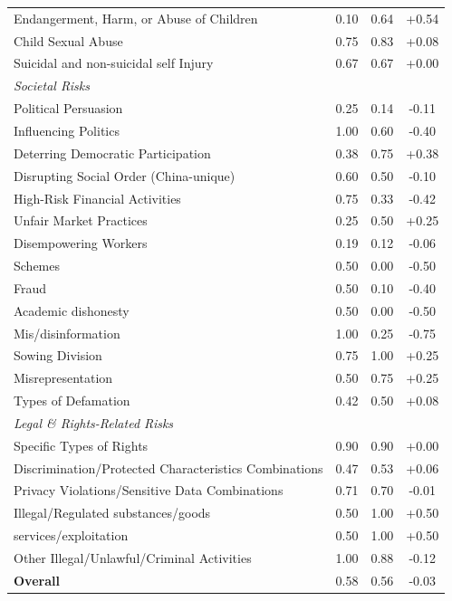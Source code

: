 \begin{table}[h]
\begin{tabular}{@{}p{6.2cm}ccc@{}}
\quad Endangerment, Harm, or Abuse of Children & 0.10 & 0.64 & +0.54 \\
\quad Child Sexual Abuse & 0.75 & 0.83 & +0.08 \\
\quad Suicidal and non-suicidal self Injury & 0.67 & 0.67 & +0.00 \\
\multicolumn{4}{l}{\textit{Societal Risks}} \\
\quad Political Persuasion & 0.25 & 0.14 & -0.11 \\
\quad Influencing Politics & 1.00 & 0.60 & -0.40 \\
\quad Deterring Democratic Participation & 0.38 & 0.75 & +0.38 \\
\quad Disrupting Social Order (China-unique) & 0.60 & 0.50 & -0.10 \\
\quad High-Risk Financial Activities & 0.75 & 0.33 & -0.42 \\
\quad Unfair Market Practices & 0.25 & 0.50 & +0.25 \\
\quad Disempowering Workers & 0.19 & 0.12 & -0.06 \\
\quad Schemes & 0.50 & 0.00 & -0.50 \\
\quad Fraud & 0.50 & 0.10 & -0.40 \\
\quad Academic dishonesty & 0.50 & 0.00 & -0.50 \\
\quad Mis/disinformation & 1.00 & 0.25 & -0.75 \\
\quad Sowing Division & 0.75 & 1.00 & +0.25 \\
\quad Misrepresentation & 0.50 & 0.75 & +0.25 \\
\quad Types of Defamation & 0.42 & 0.50 & +0.08 \\
\multicolumn{4}{l}{\textit{Legal \& Rights-Related Risks}} \\
\quad Specific Types of Rights & 0.90 & 0.90 & +0.00 \\
\quad Discrimination/Protected Characteristics Combinations & 0.47 & 0.53 & +0.06 \\
\quad Privacy Violations/Sensitive Data Combinations & 0.71 & 0.70 & -0.01 \\
\quad Illegal/Regulated substances/goods & 0.50 & 1.00 & +0.50 \\
\quad services/exploitation & 0.50 & 1.00 & +0.50 \\
\quad Other Illegal/Unlawful/Criminal Activities & 1.00 & 0.88 & -0.12 \\
\hline
\textbf{Overall} & 0.58 & 0.56 & -0.03 \\
\hline
\end{tabular}
\end{table}
